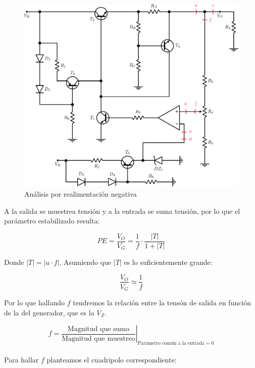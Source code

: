 \begin{figure}[!h]
\begin{centering}
\includegraphics[scale=0.34]{Imagenes/CircuitoConFeed.png}
\par\end{centering}
\caption{An\'alisis por realimentaci\'on negativa}

\end{figure}

A la salida se muestrea tensi\'on y a la entrada se suma tensi\'on, por lo que el par\'ametro estabilizado resulta:

$$PE = \frac{V_O}{V_G} = \frac{1}{f} \cdot \frac{|T|}{1+|T|}$$

Donde $|T| = |a\cdot f|$. Asumiendo que $|T|$ es lo suficientemente grande:

$$\frac{V_O}{V_G} \simeq \frac{1}{f}$$


Por lo que hallando $f$ tendremos la relaci\'on entre la tens\'on de salida en funci\'on de la del generador, que es la $V_Z$.

$$f = \left. \frac{\textrm{Magnitud que sumo}}{\textrm{Magnitud que muestreo}} \right|_{\textrm{Par\'ametro com\'un a la entrada = 0}}$$
\\
Para hallar $f$ planteamos el cuadripolo correspondiente:


